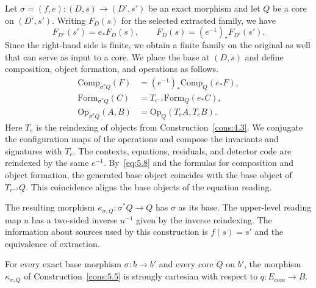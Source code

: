 \begin{construction}\label{cons:5.5}

Let $\sigma=(f,e):(D,s)\to(D',s')$ be an exact morphism and let $Q$ be a core on $(D',s')$.
Writing $F_D(s)$ for the selected extracted family, we have
\begin{equation*}
F_{D'}(s')=e_*F_D(s),\qquad
F_D(s)=(e^{-1})_*F_{D'}(s').
\tag{5.8}\label{eq:5.8}
\end{equation*}
Since the right-hand side is finite, we obtain a finite family on the original as well that
can serve as input to a core. We place the base at $(D,s)$ and define composition, object
formation, and operations as follows.
\begin{equation*}
\begin{aligned}
\mathrm{Comp}_{\sigma^*Q}(F)
 &=(e^{-1})_*\mathrm{Comp}_Q(e_*F),\\
\mathrm{Form}_{\sigma^*Q}(C)
 &=T_{e^{-1}}\mathrm{Form}_Q(e_*C),\\
\mathrm{Op}_{\sigma^*Q}(A,B)
 &=\mathrm{Op}_Q(T_eA,T_eB).
\end{aligned}
\tag{5.9}\label{eq:5.9}
\end{equation*}
Here $T_e$ is the reindexing of objects from Construction~\ref{cons:4.3}. We conjugate the
configuration maps of the operations and compose the invariants and signatures with $T_e$.
The contexts, equations, residuals, and detector code are reindexed by the same $e^{-1}$.
By~\eqref{eq:5.8} and the formulas for composition and object formation, the generated base
object coincides with the base object of $T_{e^{-1}}Q$. This coincidence aligns the base
objects of the equation reading.

The resulting morphism $\kappa_{\sigma,Q}:\sigma^*Q\to Q$ has $\sigma$ as its base. The
upper-level reading map $u$ has a two-sided inverse $u^{-1}$ given by the inverse reindexing.
The information about sources used by this construction is $f(s)=s'$ and the equivalence of
extraction.

\end{construction}

\begin{theorem}\label{thm:5.6}

For every exact base morphism $\sigma:b\to b'$ and every core $Q$ on $b'$, the morphism
$\kappa_{\sigma,Q}$ of Construction~\ref{cons:5.5} is strongly cartesian with respect to
$q:E_{\mathrm{core}}\to B$.

\end{theorem}

